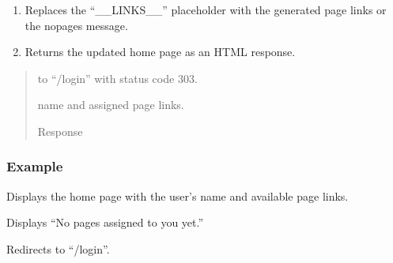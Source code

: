 \documentclass[letterpaper,10pt,english]{sphinxmanual}
\begin{document}
\begin{fulllineitems}
\begin{description}
\begin{enumerate}
\item {} 
\sphinxAtStartPar
Replaces the “\_\_LINKS\_\_” placeholder with the generated
page links or the no\sphinxhyphen{}pages message.

\item {} 
\sphinxAtStartPar
Returns the updated home page as an HTML response.

\end{enumerate}

\end{description}
\begin{quote}\begin{description}
\sphinxAtStartPar
\begin{description}
\sphinxAtStartPar
to “/login” with status code 303.

\sphinxAtStartPar
name and assigned page links.

\end{description}


\sphinxAtStartPar
Response

\end{description}\end{quote}
\subsubsection*{Example}
\begin{description}
\sphinxAtStartPar
Displays the home page with the user’s name
and available page links.

\sphinxAtStartPar
Displays “No pages assigned to you yet.”

\sphinxAtStartPar
Redirects to “/login”.

\end{description}

\end{fulllineitems}

\end{document}
